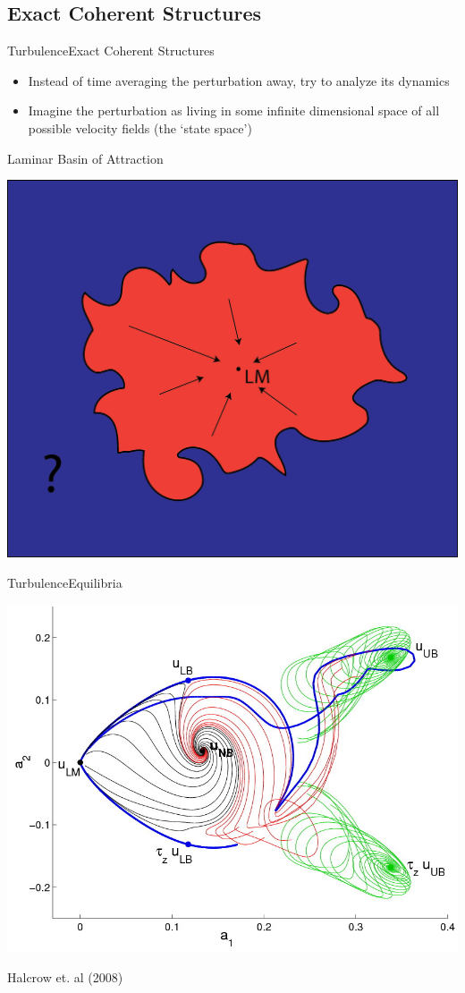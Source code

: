 \documentclass[10pt]{beamer}
\begin{document}
\subsection{Exact Coherent Structures} 
\begin{frame}{Turbulence}{Exact Coherent Structures}
\begin{itemize}
	\item<1-> Instead of time averaging the perturbation away, try to analyze its dynamics
	\item<2-> Imagine the perturbation as living in some infinite dimensional space of all possible velocity fields (the `state space') 
\end{itemize}
\end{frame} 
\begin{frame}{Laminar Basin of Attraction}

\includegraphics[scale=0.47]{Images/basinOfAttraction.png}
\end{frame}
\begin{frame}{Turbulence}{Equilibria}

\centerline{\includegraphics[scale=0.3]{Data/stateSpace}}
\hspace{8\baselineskip} {\footnotesize Halcrow et. al (2008) }

\end{frame} 
\end{document}
